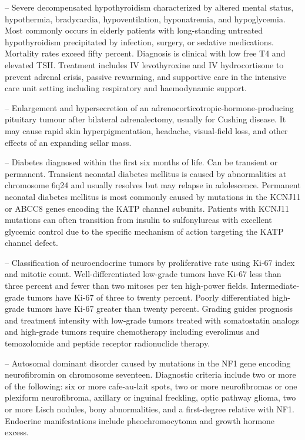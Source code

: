 -- Severe decompensated hypothyroidism characterized by altered mental status, hypothermia, bradycardia, hypoventilation, hyponatremia, and hypoglycemia. Most commonly occurs in elderly patients with long-standing untreated hypothyroidism precipitated by infection, surgery, or sedative medications. Mortality rates exceed fifty percent. Diagnosis is clinical with low free T4 and elevated TSH. Treatment includes IV levothyroxine and IV hydrocortisone to prevent adrenal crisis, passive rewarming, and supportive care in the intensive care unit setting including respiratory and haemodynamic support.

-- Enlargement and hypersecretion of an adrenocorticotropic-hormone-producing pituitary tumour after bilateral adrenalectomy, usually for Cushing disease. It may cause rapid skin hyperpigmentation, headache, visual-field loss, and other effects of an expanding sellar mass.

-- Diabetes diagnosed within the first six months of life. Can be transient or permanent. Transient neonatal diabetes mellitus is caused by abnormalities at chromosome 6q24 and usually resolves but may relapse in adolescence. Permanent neonatal diabetes mellitus is most commonly caused by mutations in the KCNJ11 or ABCC8 genes encoding the KATP channel subunits. Patients with KCNJ11 mutations can often transition from insulin to sulfonylureas with excellent glycemic control due to the specific mechanism of action targeting the KATP channel defect.

-- Classification of neuroendocrine tumors by proliferative rate using Ki-67 index and mitotic count. Well-differentiated low-grade tumors have Ki-67 less than three percent and fewer than two mitoses per ten high-power fields. Intermediate-grade tumors have Ki-67 of three to twenty percent. Poorly differentiated high-grade tumors have Ki-67 greater than twenty percent. Grading guides prognosis and treatment intensity with low-grade tumors treated with somatostatin analogs and high-grade tumors require chemotherapy including everolimus and temozolomide and peptide receptor radionuclide therapy.

-- Autosomal dominant disorder caused by mutations in the NF1 gene encoding neurofibromin on chromosome seventeen. Diagnostic criteria include two or more of the following: six or more cafe-au-lait spots, two or more neurofibromas or one plexiform neurofibroma, axillary or inguinal freckling, optic pathway glioma, two or more Lisch nodules, bony abnormalities, and a first-degree relative with NF1. Endocrine manifestations include pheochromocytoma and growth hormone excess.

